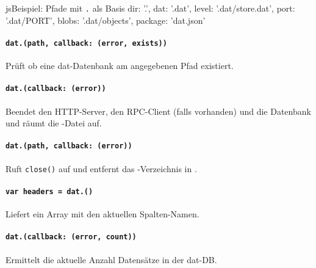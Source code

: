 \begin{srclst}{js}{Beispiel: Pfade mit \texttt{.} als Basis}
{ 
    dir: '.',
    dat: '.dat',
    level: '.dat/store.dat',
    port: '.dat/PORT',
    blobs: '.dat/objects',
    package: 'dat.json' 
}
\end{srclst}

\paragraph{\texttt{dat.(path, callback: (error, exists))}}
Prüft ob eine dat-Datenbank am angegebenen Pfad existiert.

\paragraph{\texttt{dat.(callback: (error))}}
Beendet den HTTP-Server, den RPC-Client (falls vorhanden) und die Datenbank und räumt die -Datei auf.

\paragraph{\texttt{dat.(path, callback: (error))}}
Ruft \texttt{close()} auf und entfernt das -Verzeichnis in .

\paragraph{\texttt{var headers = dat.()}}
Liefert ein Array mit den aktuellen Spalten-Namen.

\paragraph{\texttt{dat.(callback: (error, count))}}
Ermittelt die aktuelle Anzahl Datensätze in der dat-DB.


